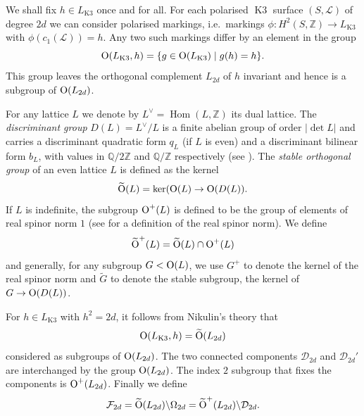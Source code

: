 \documentclass[a4paper,11pt]{article}
\newcommand{\QQ}{\mathbb Q}
\newcommand{\ZZ}{\mathbb Z}
\renewcommand{\cD}{\mathcal D}
\newcommand{\cF}{\mathcal F}
\renewcommand{\cL}{\mathcal L}
\renewcommand{\Tilde}{\widetilde}
\newcommand{\Orth}{\mathop{\null\mathrm {O}}\nolimits}
\newcommand{\Hom}{\mathop{\mathrm {Hom}}\nolimits}
\newcommand{\Kthree}{\mathop{\mathrm {K3}}\nolimits}
\begin{document}
We shall fix $h\in L_{\Kthree}$ once and for all.  For each polarised
$\Kthree$ surface $(S,\cL)$ of degree $2d$ we can consider polarised
markings, i.e.\ markings $\phi\colon H^2(S,\ZZ) \to L_{\Kthree}$ with
$\phi(c_1(\cL))=h$.  Any two such markings differ by an element in the
group
\begin{equation}\label{defineOLh}
\Orth(L_{\Kthree},h) = \{g \in \Orth(L_{\Kthree}) \mid g(h)=h \}.
\end{equation}
This group leaves the orthogonal complement $L_{2d}$ of $h$ invariant
and hence is a subgroup of $\Orth(L_{2d})$.

For any lattice $L$ we denote by $L^\vee=\Hom (L, \ZZ)$ its dual
lattice. The \emph{discriminant group} $D(L)=L^\vee/L$ is a finite
abelian group of order $|\det L|$ and carries a discriminant quadratic
form $q_L$ (if $L$ is even) and a discriminant bilinear form $b_L$,
with values in $\QQ/2\ZZ$ and $\QQ/\ZZ$ respectively (see \cite
[Section~1.3]{Nik2}). The \emph{stable orthogonal group} of an even
lattice $L$ is defined as the kernel
\begin{equation}\label{definestablegroup}
\Tilde{\Orth}(L) = \ker (\Orth(L) \to \Orth(D(L)).
\end{equation}
If $L$ is indefinite, the subgroup $\Orth^+(L)$ is defined to be the
group of elements of real spinor norm $1$ (see \cite{GHScomm} for a
definition of the real spinor norm). We define
\begin{equation}\label{defineOtilde+}
\Tilde{\Orth}^+(L)=\Tilde{\Orth}(L) \cap\Orth^+(L)
\end{equation}
and generally, for any subgroup $G<\Orth(L)$, we use $G^+$ to denote
the kernel of the real spinor norm and $\Tilde G$ to denote the stable
subgroup, the kernel of $G\to \Orth(D(L))$.

For $h\in L_{\Kthree}$ with $h^2=2d$, it follows from Nikulin's theory
\cite[Corollary 1.5.2]{Nik2} that
\begin{equation*}
\Orth(L_{\Kthree},h) = \Tilde{\Orth}(L_{2d})
\end{equation*}
considered as subgroups of $\Orth(L_{2d})$.
The two connected components $\cD_{2d}$ and $\cD_{2d}'$ are
interchanged by the group $\Orth(L_{2d})$. The index $2$ subgroup that
fixes the components is $\Orth^+(L_{2d})$. Finally we define
\begin{equation}\label{F2d}
\cF_{2d} = \Tilde{\Orth}(L_{2d}) \backslash \Omega_{2d} =
\Tilde{\Orth}^+(L_{2d}) \backslash \cD_{2d}.
\end{equation}
\end{document}
